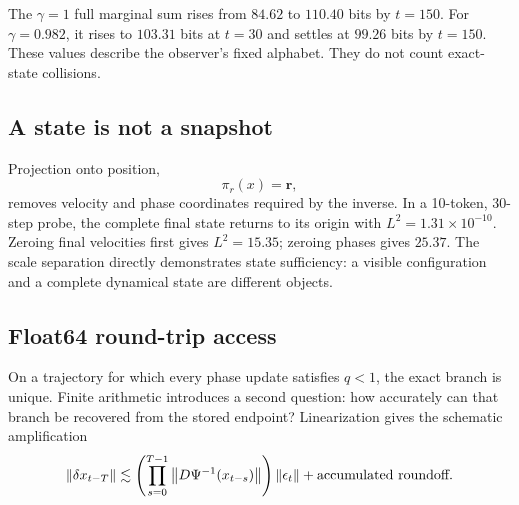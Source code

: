 The \(\gamma=1\) full marginal sum rises from \(84.62\) to \(110.40\) bits by \(t=150\). For \(\gamma=0.982\), it rises to \(103.31\) bits at \(t=30\) and settles at \(99.26\) bits by \(t=150\). These values describe the observer's fixed alphabet. They do not count exact-state collisions.

\subsection{A state is not a snapshot}

Projection onto position,
\[
\pi_r(x)=\bm r,
\]
removes velocity and phase coordinates required by the inverse. In a 10-token, 30-step probe, the complete final state returns to its origin with \(L^2=1.31\times10^{-10}\). Zeroing final velocities first gives \(L^2=15.35\); zeroing phases gives \(25.37\). The scale separation directly demonstrates state sufficiency: a visible configuration and a complete dynamical state are different objects.

\subsection{Float64 round-trip access}

On a trajectory for which every phase update satisfies \(q<1\), the exact branch is unique. Finite arithmetic introduces a second question: how accurately can that branch be recovered from the stored endpoint? Linearization gives the schematic amplification
\begin{equation}
\left\lVert \delta x_{t-T}\right\rVert
\lesssim
\left(
\prod_{s=0}^{T-1}
\left\lVert D\Psi^{-1}(x_{t-s})\right\rVert
\right)
\left\lVert \epsilon_t\right\rVert
+\text{accumulated roundoff}.
\label{eq:error-amplification}
\end{equation}

